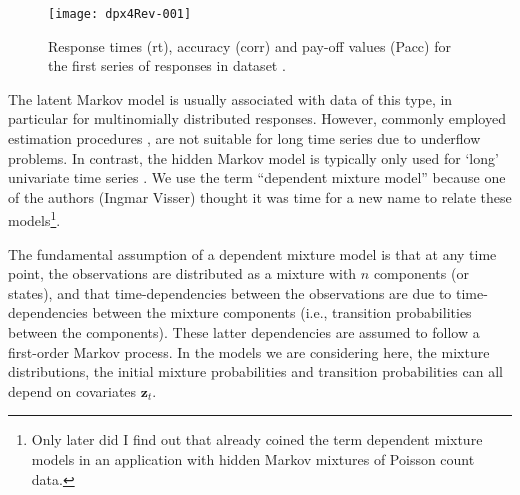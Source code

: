 \documentclass[article]{jss}
\newcommand{\vc}{\mathbf}
\newcommand{\greekv}[1]{\mbox{\boldmath$\mathrm{#1}$}}
\begin{document}
\begin{figure}[htbp]
\begin{center}
\texttt{[image: dpx4Rev-001]}
	 \caption{Response times (rt), accuracy (corr) and pay-off values (Pacc) for
	  the first series of responses in dataset .}
	  \label{fig:speed}
	  
\end{center}
\end{figure}

The latent Markov model is usually associated with data of this type,
in particular for multinomially distributed responses.  However,
commonly employed estimation procedures \citep[e.g.,][]{Pol1996}, are
not suitable for long time series due to underflow problems.  In
contrast, the hidden Markov model is typically only used for `long'
univariate time series \citep[][chapter~1]{Cappe2005}.  We use the
term ``dependent mixture model'' because one of the authors (Ingmar
Visser) thought it was time for a new name to relate these
models\footnote{Only later did I find out that \citet{Leroux1992}
already coined the term dependent mixture models in an application
with hidden Markov mixtures of Poisson count data.}.

The fundamental assumption of a dependent mixture model is that at any
time point, the observations are distributed as a mixture with $n$
components (or states), and that time-dependencies between the
observations are due to time-dependencies between the mixture
components (i.e., transition probabilities between the components).
These latter dependencies are assumed to follow a first-order Markov
process.  In the models we are considering here, the mixture
distributions, the initial mixture probabilities and transition
probabilities can all depend on covariates $\vc{z}_t$.

\end{document}
